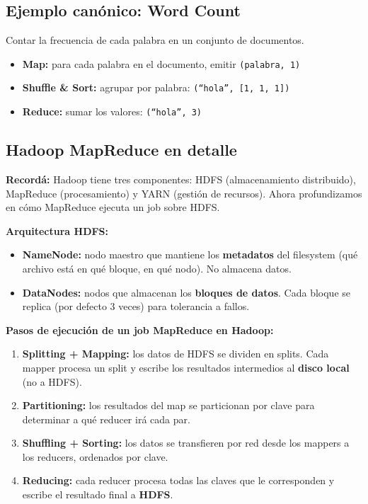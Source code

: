\documentclass[11pt, a4paper]{article}
\begin{document}
\subsection{Ejemplo canónico: Word Count}

Contar la frecuencia de cada palabra en un conjunto de documentos.

\begin{itemize}
	\item \textbf{Map:} para cada palabra en el documento, emitir \texttt{(palabra, 1)}
	\item \textbf{Shuffle \& Sort:} agrupar por palabra: \texttt{(``hola'', [1, 1, 1])}
	\item \textbf{Reduce:} sumar los valores: \texttt{(``hola'', 3)}
\end{itemize}

\subsection{Hadoop MapReduce en detalle}

\begin{recallbox}
	\textbf{Recordá:} Hadoop tiene tres componentes: HDFS (almacenamiento distribuido), MapReduce (procesamiento) y YARN (gestión de recursos). Ahora profundizamos en cómo MapReduce ejecuta un job sobre HDFS.
\end{recallbox}

\textbf{Arquitectura HDFS:}
\begin{itemize}
	\item \textbf{NameNode:} nodo maestro que mantiene los \textbf{metadatos} del filesystem (qué archivo está en qué bloque, en qué nodo). No almacena datos.
	\item \textbf{DataNodes:} nodos que almacenan los \textbf{bloques de datos}. Cada bloque se replica (por defecto 3 veces) para tolerancia a fallos.
\end{itemize}

\textbf{Pasos de ejecución de un job MapReduce en Hadoop:}
\begin{enumerate}
	\item \textbf{Splitting + Mapping:} los datos de HDFS se dividen en splits. Cada mapper procesa un split y escribe los resultados intermedios al \textbf{disco local} (no a HDFS).
	\item \textbf{Partitioning:} los resultados del map se particionan por clave para determinar a qué reducer irá cada par.
	\item \textbf{Shuffling + Sorting:} los datos se transfieren por red desde los mappers a los reducers, ordenados por clave.
	\item \textbf{Reducing:} cada reducer procesa todas las claves que le corresponden y escribe el resultado final a \textbf{HDFS}.
\end{enumerate}
\end{document}
